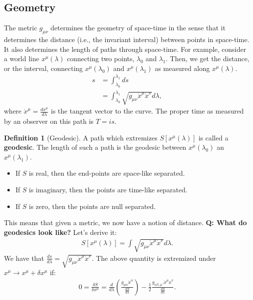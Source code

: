 \documentclass[11pt]{article}
\newcommand{\grmetric}[0]{g_{\mu \nu}}
\theoremstyle{definition}
\newtheorem{definition}{Definition}[section]
\begin{document}
\subsection{Geometry}
The metric \( \grmetric \) determines the geometry of space-time in the sense that it determines the distance (i.e., the invariant interval) between points in space-time. It also determines the length of paths through space-time. For example, consider a world line \( x^\mu (\lambda) \) connecting two points, \( \lambda_0 \) and \( \lambda_1 \). Then, we get the distance, or the interval, connecting \( x^\mu (\lambda_0) \) and \( x^\mu (\lambda_1) \) as measured along \( x^\mu (\lambda) \). 
\begin{align*}
	s & = \int_{\lambda_0}^{\lambda_1} ds \\
	  & = \int_{\lambda_0}^{\lambda_1} \sqrt{\grmetric \dot{x}^\mu \dot{x}^\nu }  d \lambda, 
\end{align*}
where \( \dot{x}^\mu = \frac{dx^\mu}{d \lambda} \) is the tangent vector to the curve. The proper time as measured by an observer on this path is \( T = is \). 
\begin{definition}[Geodesic]\label{dfn:geodesic}
	A path which extremizes  \( S[x^\mu (\lambda) ] \) is called a \textbf{geodesic}. The length of such a path is the geodesic between \( x^\mu (\lambda_0) \) an \( x^\mu (\lambda_1) \). 
\end{definition}
\begin{itemize}[noitemsep]
	\item If \( S \) is real, then the end-points are space-like separated. 
	\item If \( S \) is imaginary, then the points are time-like separated. 
	\item If \( S \) is zero, then the points are null separated. 
\end{itemize}
This means that given a metric, we now have a notion of distance. 
\newline
\newline
\textbf{Q: What do geodesics look like?}
\newline
Let's derive it:
\begin{align*}
	S[x^\mu (\lambda)] = \int \sqrt{\grmetric \dot{x}^\mu \dot{x}^\nu} d \lambda.
\end{align*}
We have that \( \frac{ds}{d \lambda} = \sqrt{\grmetric \dot{x}^\mu \dot{x}^\nu} \). The above quantity is extremized under \( x^\mu \rightarrow x^\mu + \delta x^\mu \) if: 
\begin{align}\label{derivation:geodesic1} 
	0 = \frac{\delta S}{\delta x^\mu} = \frac{d}{d \lambda} \left( \frac{g_{\mu \alpha} \dot{x}^\alpha }{\frac{dS}{d \lambda}} \right)  - \frac{1}{2} \frac{g_{\alpha \beta, \mu}. \dot{x}^\mu \dot{x}^\nu }{\frac{dS}{d \lambda}}.
\end{align}
\end{document}
